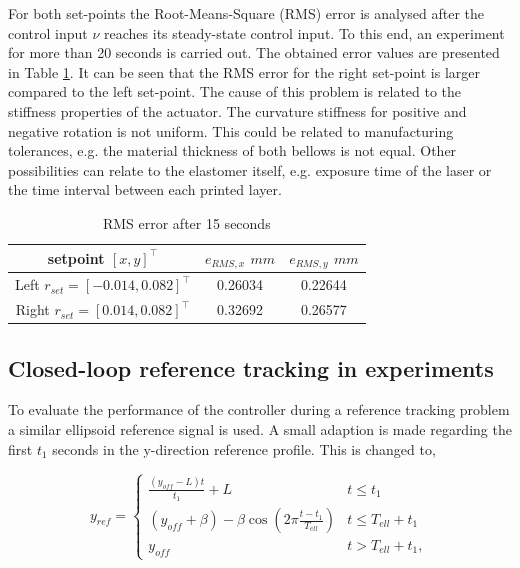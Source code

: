 For both set-points the Root-Means-Square (RMS) error is analysed after the control input $\nu$ reaches its steady-state control input. To this end, an experiment for more than 20 seconds is carried out. The obtained error values are presented in Table \ref{tab:RMSerrors}. It can be seen that the RMS error for the right set-point is larger compared to the left set-point. The cause of this problem is related to the stiffness properties of the actuator. The curvature stiffness for positive and negative rotation is not uniform. This could be related to manufacturing tolerances, e.g. the material thickness of both bellows is not equal. Other possibilities can relate to the elastomer itself, e.g. exposure time of the laser or the time interval between each printed layer. 



\begin{table}[H]
    \centering
    \caption{RMS error after 15 seconds}
    \begin{tabular}{|c|c|c|} \hline
     setpoint $[x,y]^\top$    & $e_{RMS,x}$ $mm$  &  $e_{RMS,y}$ $mm$  \\ \hline
    Left $r_{set}= [-0.014,0.082]^\top$     & 0.26034  & 0.22644 \\ \hline
    Right $r_{set}= [0.014,0.082]^\top$  &  0.32692&   0.26577\\ \hline
    \end{tabular}
    \label{tab:RMSerrors}
\end{table}



\subsection*{Closed-loop reference tracking in experiments}

To evaluate the performance of the controller during a reference tracking problem a similar ellipsoid reference signal is used. A small adaption is made regarding the first $t_1$ seconds in the y-direction reference profile. This is changed to,


\begin{equation}
    y_{ref} = \begin{cases} 
      \frac{(y_{off} - L) t}{t_1} + L&  t \leq t_1 \\
     (y_{off} +\beta) -  \beta \cos(2\pi \frac{t - t_1}{T_{ell}}) & t \leq T_{ell} + t_1 \\
     y_{off} & t > T_{ell} + t_1,
   \end{cases} 
\end{equation}

